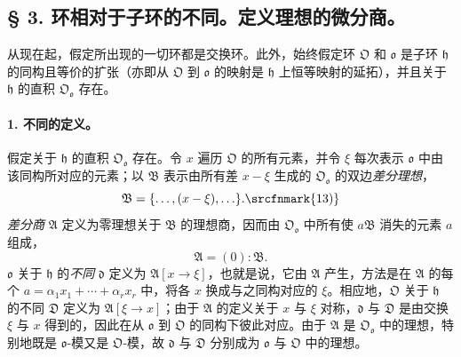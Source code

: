 \subsection*{§ 3. 环相对于子环的不同。定义理想的微分商。}

从现在起，假定所出现的一切环都是交换环。此外，始终假定环 $\mathfrak O$ 和 $\mathfrak o$ 是子环 $\mathfrak h$ 的同构且等价的扩张（亦即从 $\mathfrak O$ 到 $\mathfrak o$ 的映射是 $\mathfrak h$ 上恒等映射的延拓），并且关于 $\mathfrak h$ 的直积 $\mathfrak O_{\mathfrak o}$ 存在。

\paragraph{1. 不同的定义。}
假定关于 $\mathfrak h$ 的直积 $\mathfrak O_{\mathfrak o}$ 存在。令 $x$ 遍历 $\mathfrak O$ 的所有元素，并令 $\xi$ 每次表示 $\mathfrak o$ 中由该同构所对应的元素；以 $\mathfrak B$ 表示由所有差 $x-\xi$ 生成的 $\mathfrak O_{\mathfrak o}$ 的双边\emph{差分理想}，
\[
\mathfrak B=\{\ldots,(x-\xi),\ldots\}.\srcfnmark{13)}
\]
\emph{差分商} $\mathfrak A$ 定义为零理想关于 $\mathfrak B$ 的理想商，因而由 $\mathfrak O_{\mathfrak o}$ 中所有使 $a\mathfrak B$ 消失的元素 $a$ 组成，
\[
\mathfrak A=(0):\mathfrak B.
\]
$\mathfrak o$ 关于 $\mathfrak h$ 的\emph{不同} $\mathfrak d$ 定义为 $\mathfrak A[x\to\xi]$，也就是说，它由 $\mathfrak A$ 产生，方法是在 $\mathfrak A$ 的每个 $a=\alpha_1x_1+\cdots+\alpha_rx_r$ 中，将各 $x$ 换成与之同构对应的 $\xi$。相应地，$\mathfrak O$ 关于 $\mathfrak h$ 的不同 $\mathfrak D$ 定义为 $\mathfrak A[\xi\to x]$；由于 $\mathfrak A$ 的定义关于 $x$ 与 $\xi$ 对称，$\mathfrak d$ 与 $\mathfrak D$ 是由交换 $\xi$ 与 $x$ 得到的，因此在从 $\mathfrak o$ 到 $\mathfrak O$ 的同构下彼此对应。由于 $\mathfrak A$ 是 $\mathfrak O_{\mathfrak o}$ 中的理想，特别地既是 $\mathfrak o$-模又是 $\mathfrak O$-模，故 $\mathfrak d$ 与 $\mathfrak D$ 分别成为 $\mathfrak o$ 与 $\mathfrak O$ 中的理想。

